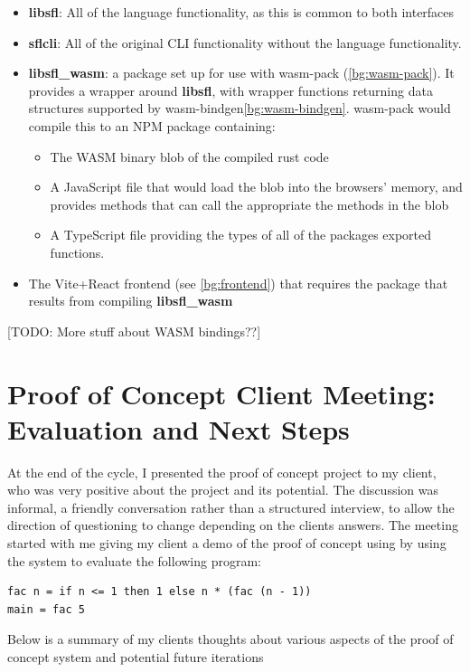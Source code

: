 \begin{itemize}
    \item \textbf{libsfl}: All of the language functionality, as this is common to both interfaces
    \item \textbf{sflcli}: All of the original CLI functionality without the language functionality.  
    \item \textbf{libsfl\_wasm}: a package set up for use with wasm-pack (\ref{bg:wasm-pack}). It provides a wrapper around \textbf{libsfl}, with wrapper functions returning data structures supported by wasm-bindgen\ref{bg:wasm-bindgen}. wasm-pack would compile this to an \ac{NPM} package containing:
    \begin{itemize}
        \item The WASM binary blob of the compiled rust code
        \item A JavaScript file that would load the blob into the browsers' memory, and provides methods that can call the appropriate the methods in the blob
        \item A TypeScript file providing the types of all of the packages exported functions. 
    \end{itemize}
    \item The Vite+React frontend (see \ref{bg:frontend}) that requires the package that results from compiling \textbf{libsfl\_wasm}
\end{itemize}


[TODO: More stuff about WASM bindings??]

\section{Proof of Concept Client Meeting: Evaluation and \newline Next Steps}
\label{eval:c1}
At the end of the cycle, I presented the proof of concept project to my client, who was very positive about the project and its potential. The discussion was informal, a friendly conversation rather than a structured interview, to allow the direction of questioning to change depending on the clients answers. The meeting started with me giving my client a demo of the proof of concept using by using the system to evaluate the following program:
\begin{verbatim}
fac n = if n <= 1 then 1 else n * (fac (n - 1))
main = fac 5
\end{verbatim}

Below is a summary of my clients thoughts about various aspects of the proof of concept system and potential future iterations

